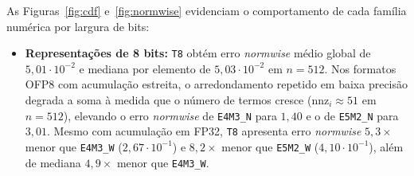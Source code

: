 \documentclass[journal]{IEEEtran}
\begin{document}
As Figuras~\ref{fig:cdf} e~\ref{fig:normwise} evidenciam o comportamento de
cada família numérica por largura de bits:
\begin{itemize}
\item \textbf{Representações de 8 bits:} \texttt{T8} obtém erro \emph{normwise}
médio global de $5{,}01\cdot 10^{-2}$ e mediana por elemento de
$5{,}03\cdot 10^{-2}$ em $n=512$. Nos formatos OFP8 com acumulação estreita, o
arredondamento repetido em baixa precisão degrada a soma à medida que o número
de termos cresce ($\mathrm{nnz}_i \approx 51$ em $n=512$), elevando o erro
\emph{normwise} de \texttt{E4M3\_N} para $1{,}40$ e o de \texttt{E5M2\_N} para
$3{,}01$. Mesmo com acumulação em FP32, \texttt{T8} apresenta erro
\emph{normwise} $5{,}3\times$ menor que \texttt{E4M3\_W} ($2{,}67\cdot 10^{-1}$)
e $8{,}2\times$ menor que \texttt{E5M2\_W} ($4{,}10\cdot 10^{-1}$), além de
mediana $4{,}9\times$ menor que \texttt{E4M3\_W}.


\end{itemize}
\end{document}
